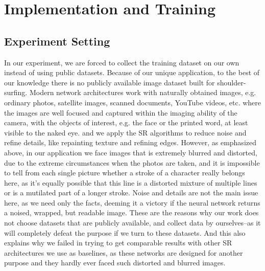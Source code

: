 \section{Implementation and Training}

\label{sec-implementation-and-evaluation}

\subsection{Experiment Setting}
\label{sec-experiment-setting}
In our experiment, we are forced to collect the training dataset on our own instead of using public datasets. Because of our unique application, to the best of our knowledge there is no publicly available image dataset built for shoulder-surfing. Modern network architectures work with naturally obtained images, e.g. ordinary photos, satellite images, scanned documents, YouTube videos, etc. where the images are well focused and captured within the imaging ability of the camera, with the objects of interest, e.g. the face or the printed word, at least visible to the naked eye. and we apply the SR algorithms to reduce noise and refine details, like repainting texture and refining edges. However, as emphasized above, in our application we face images that is extremely blurred and distorted, due to the extreme circumstances when the photos are taken, and it is impossible to tell from each single picture whether a stroke of a character really belongs here, as it's equally possible that this line is a distorted mixture of multiple lines or is a mutilated part of a longer stroke. Noise and details are not the main issue here, as we need only the facts, deeming it a victory if the neural network returns a noised, wrapped, but readable image. These are the reasons why our work does not choose datasets that are publicly available, and collect data by ourselves--as it will completely defeat the purpose if we turn to these datasets. And this also explains why we failed in trying to get comparable results with other SR architectures we use as baselines, as these networks are designed for another purpose and they hardly ever faced such distorted and blurred images.

